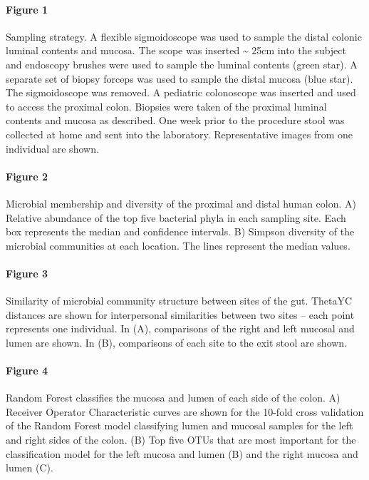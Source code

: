 \documentclass[11pt,]{article}
\let\oldparagraph\paragraph
\renewcommand{\paragraph}[1]{\oldparagraph{#1}\mbox{}}
\begin{document}
\paragraph{Figure 1}\label{figure-1}

Sampling strategy. A flexible sigmoidoscope was used to sample the
distal colonic luminal contents and mucosa. The scope was inserted
\textasciitilde{} 25cm into the subject and endoscopy brushes were used
to sample the luminal contents (green star). A separate set of biopsy
forceps was used to sample the distal mucosa (blue star). The
sigmoidoscope was removed. A pediatric colonoscope was inserted and used
to access the proximal colon. Biopsies were taken of the proximal
luminal contents and mucosa as described. One week prior to the
procedure stool was collected at home and sent into the laboratory.
Representative images from one individual are shown.

\newpage

\paragraph{Figure 2}\label{figure-2}

Microbial membership and diversity of the proximal and distal human
colon. A) Relative abundance of the top five bacterial phyla in each
sampling site. Each box represents the median and confidence intervals.
B) Simpson diversity of the microbial communities at each location. The
lines represent the median values.

\newpage

\paragraph{Figure 3}\label{figure-3}

Similarity of microbial community structure between sites of the gut.
ThetaYC distances are shown for interpersonal similarities between two
sites -- each point represents one individual. In (A), comparisons of
the right and left mucosal and lumen are shown. In (B), comparisons of
each site to the exit stool are shown.

\newpage

\paragraph{Figure 4}\label{figure-4}

Random Forest classifies the mucosa and lumen of each side of the colon.
A) Receiver Operator Characteristic curves are shown for the 10-fold
cross validation of the Random Forest model classifying lumen and
mucosal samples for the left and right sides of the colon. (B) Top five
OTUs that are most important for the classification model for the left
mucosa and lumen (B) and the right mucosa and lumen (C).
\end{document}
